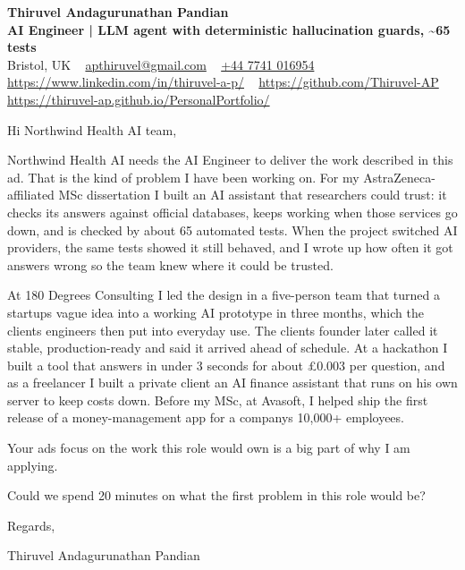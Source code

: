 \documentclass[11pt,a4paper]{article}
\begin{document}
\raggedright
\pagestyle{empty}

\begin{center}
    {\LARGE \color{linkblue} \textbf{Thiruvel Andagurunathan Pandian}}\\[0.2cm]
    {\color{headernavy}\small\textbf{AI Engineer | LLM agent with deterministic hallucination guards, \textasciitilde{}65 tests}}\\[0.2cm]
    {\small Bristol, UK\nobreak\ \,\textbar\, \href{mailto:apthiruvel@gmail.com}{apthiruvel@gmail.com}\nobreak\ \,\textbar\, \href{tel:+447741016954}{+44 7741 016954}\nobreak\ \,\textbar\, \href{https://www.linkedin.com/in/thiruvel-a-p/}{https://www.linkedin.com/in/thiruvel-a-p/}\nobreak\ \,\textbar\, \href{https://github.com/Thiruvel-AP}{https://github.com/Thiruvel-AP}\nobreak\ \,\textbar\, \href{https://thiruvel-ap.github.io/PersonalPortfolio/}{https://thiruvel-ap.github.io/PersonalPortfolio/}}

\end{center}

\vspace{0.4cm}

\noindent
Hi Northwind Health AI team,

Northwind Health AI needs the AI Engineer to deliver the work described in this ad. That is the kind of problem I have been working on. For my AstraZeneca-affiliated MSc dissertation I built an AI assistant that researchers could trust: it checks its answers against official databases, keeps working when those services go down, and is checked by about 65 automated tests. When the project switched AI providers, the same tests showed it still behaved, and I wrote up how often it got answers wrong so the team knew where it could be trusted.

At 180 Degrees Consulting I led the design in a five-person team that turned a startup\textquotesingle{}s vague idea into a working AI prototype in three months, which the client\textquotesingle{}s engineers then put into everyday use. The client\textquotesingle{}s founder later called it \textquotedbl{}stable, production-ready\textquotedbl{} and said it arrived \textquotedbl{}ahead of schedule\textquotedbl{}. At a hackathon I built a tool that answers in under 3 seconds for about £0.003 per question, and as a freelancer I built a private client an AI finance assistant that runs on his own server to keep costs down. Before my MSc, at Avasoft, I helped ship the first release of a money-management app for a company\textquotesingle{}s 10,000+ employees.

Your ad\textquotesingle{}s focus on the work this role would own is a big part of why I am applying.

Could we spend 20 minutes on what the first problem in this role would be?

\vspace{0.5cm}

Regards,

Thiruvel Andagurunathan Pandian
\end{document}
